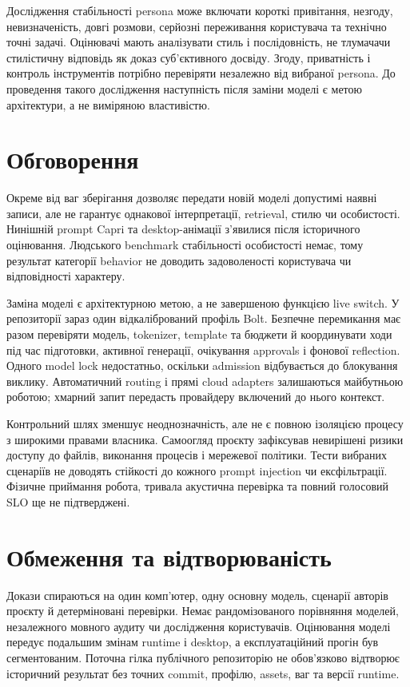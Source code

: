 \documentclass[11pt]{article}
\begin{document}
Дослідження стабільності persona може включати короткі привітання, незгоду, невизначеність, довгі розмови, серйозні переживання користувача та технічно точні задачі. Оцінювачі мають аналізувати стиль і послідовність, не тлумачачи стилістичну відповідь як доказ суб'єктивного досвіду. Згоду, приватність і контроль інструментів потрібно перевіряти незалежно від вибраної persona. До проведення такого дослідження наступність після заміни моделі є метою архітектури, а не виміряною властивістю.

\section{Обговорення}
Окреме від ваг зберігання дозволяє передати новій моделі допустимі наявні записи, але не гарантує однакової інтерпретації, retrieval, стилю чи особистості. Нинішній prompt Capri та desktop-анімації з'явилися після історичного оцінювання. Людського benchmark стабільності особистості немає, тому результат категорії behavior не доводить задоволеності користувача чи відповідності характеру.

Заміна моделі є архітектурною метою, а не завершеною функцією live switch. У репозиторії зараз один відкалібрований профіль Bolt. Безпечне перемикання має разом перевіряти модель, tokenizer, template та бюджети й координувати ходи під час підготовки, активної генерації, очікування approvals і фонової reflection. Одного model lock недостатньо, оскільки admission відбувається до блокування виклику. Автоматичний routing і прямі cloud adapters залишаються майбутньою роботою; хмарний запит передасть провайдеру включений до нього контекст.

Контрольний шлях зменшує неоднозначність, але не є повною ізоляцією процесу з широкими правами власника. Самоогляд проєкту зафіксував невирішені ризики доступу до файлів, виконання процесів і мережевої політики. Тести вибраних сценаріїв не доводять стійкості до кожного prompt injection чи ексфільтрації. Фізичне приймання робота, тривала акустична перевірка та повний голосовий SLO ще не підтверджені.

\section{Обмеження та відтворюваність}
Докази спираються на один комп'ютер, одну основну модель, сценарії авторів проєкту й детерміновані перевірки. Немає рандомізованого порівняння моделей, незалежного мовного аудиту чи дослідження користувачів. Оцінювання моделі передує подальшим змінам runtime і desktop, а експлуатаційний прогін був сегментованим. Поточна гілка публічного репозиторію не обов'язково відтворює історичний результат без точних commit, профілю, assets, ваг та версії runtime.
\end{document}
